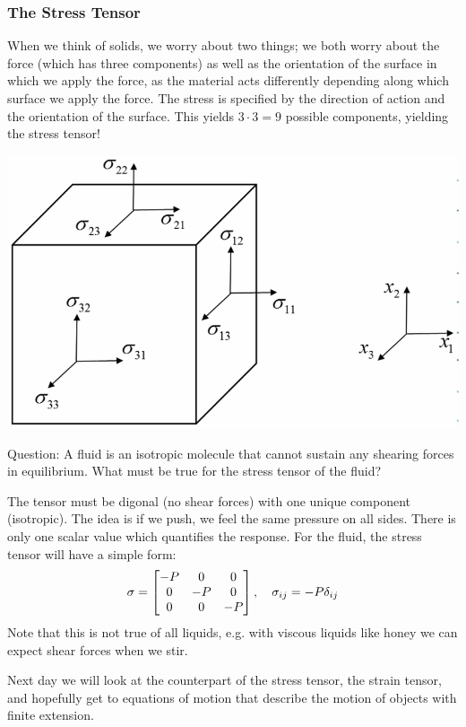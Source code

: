 \documentclass[../PHYS306Notes.tex]{subfiles}
\begin{document}
\subsubsection{The Stress Tensor}
When we think of solids, we worry about two things; we both worry about the force (which has three components) as well as the orientation of the surface in which we apply the force, as the material acts differently depending along which surface we apply the force. The stress is specified by the direction of action and the orientation of the surface. This yields $3 \cdot 3 = 9$ possible components, yielding the stress tensor!
\begin{center}
    \includegraphics[scale=0.5]{Lecture-30/l30-img7.png}
\end{center}
Question: A fluid is an isotropic molecule that cannot sustain any shearing forces in equilibrium. What must be true for the stress tensor of the fluid?
\begin{s}
    The tensor must be digonal (no shear forces) with one unique component (isotropic). The idea is if we push, we feel the same pressure on all sides. There is only one scalar value which quantifies the response. For the fluid, the stress tensor will have a simple form:
    \[\sigma = \begin{bmatrix}-P & 0 & 0 \\ 0 & -P & 0 \\ 0 & 0 & -P\end{bmatrix}, \quad  \sigma_{ij} = -P\delta_{ij}\]
    Note that this is not true of all liquids, e.g. with viscous liquids like honey we can expect shear forces when we stir.
\end{s}
Next day we will look at the counterpart of the stress tensor, the strain tensor, and hopefully get to equations of motion that describe the motion of objects with finite extension. 
\end{document}

